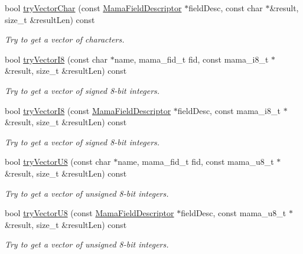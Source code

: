 \begin{DoxyCompactItemize}
bool \hyperlink{classWombat_1_1MamaMsg_a8f72e7c6ded3298d4129d9d77fb7ff40}{tryVectorChar} (const \hyperlink{classWombat_1_1MamaFieldDescriptor}{MamaFieldDescriptor} $\ast$fieldDesc, const char $\ast$\&result, size\_\-t \&resultLen) const 
\begin{DoxyCompactList}\small\item\em Try to get a vector of characters. \item\end{DoxyCompactList}\item 
bool \hyperlink{classWombat_1_1MamaMsg_ae1402419192820e577586ec9a30b9d79}{tryVectorI8} (const char $\ast$name, mama\_\-fid\_\-t fid, const mama\_\-i8\_\-t $\ast$\&result, size\_\-t \&resultLen) const 
\begin{DoxyCompactList}\small\item\em Try to get a vector of signed 8-\/bit integers. \item\end{DoxyCompactList}\item 
bool \hyperlink{classWombat_1_1MamaMsg_a71da30e829c5c9cee93a10b7e3aa2816}{tryVectorI8} (const \hyperlink{classWombat_1_1MamaFieldDescriptor}{MamaFieldDescriptor} $\ast$fieldDesc, const mama\_\-i8\_\-t $\ast$\&result, size\_\-t \&resultLen) const 
\begin{DoxyCompactList}\small\item\em Try to get a vector of signed 8-\/bit integers. \item\end{DoxyCompactList}\item 
bool \hyperlink{classWombat_1_1MamaMsg_a34641cb35966312142cf25c4bba6188f}{tryVectorU8} (const char $\ast$name, mama\_\-fid\_\-t fid, const mama\_\-u8\_\-t $\ast$\&result, size\_\-t \&resultLen) const 
\begin{DoxyCompactList}\small\item\em Try to get a vector of unsigned 8-\/bit integers. \item\end{DoxyCompactList}\item 
bool \hyperlink{classWombat_1_1MamaMsg_a8de5381c1492984e0c7cd8435778a56e}{tryVectorU8} (const \hyperlink{classWombat_1_1MamaFieldDescriptor}{MamaFieldDescriptor} $\ast$fieldDesc, const mama\_\-u8\_\-t $\ast$\&result, size\_\-t \&resultLen) const 
\begin{DoxyCompactList}\small\item\em Try to get a vector of unsigned 8-\/bit integers. \item\end{DoxyCompactList}\item 

\end{DoxyCompactItemize}
